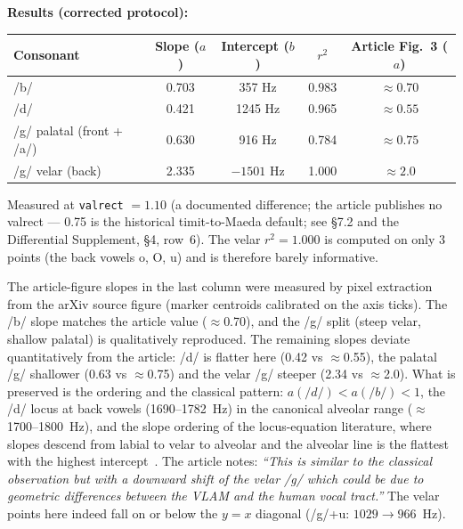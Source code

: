 \documentclass[11pt,a4paper]{article}
\begin{document}
\textbf{Results (corrected protocol):}

\begin{center}
\begin{tabular}{lcccc}
\toprule
Consonant & Slope ($a$) & Intercept ($b$) & $r^2$ & Article Fig.~3 ($a$) \\
\midrule
/b/ & 0.703 & 357 Hz & 0.983 & $\approx 0.70$ \\
/d/ & 0.421 & 1245 Hz & 0.965 & $\approx 0.55$ \\
/g/ palatal (front + /a/) & 0.630 & 916 Hz & 0.784 & $\approx 0.75$ \\
/g/ velar (back) & 2.335 & $-1501$ Hz & 1.000 & $\approx 2.0$ \\
\bottomrule
\end{tabular}

\smallskip
Measured at \texttt{valrect} $= 1.10$ (a documented difference; the
article publishes no valrect --- 0.75 is the historical timit-to-Maeda
default; see \S7.2 and the Differential Supplement, \S4, row~6). The
velar $r^2 = 1.000$ is
computed on only 3 points (the back vowels o, O, u) and is therefore
barely informative.
\end{center}

The article-figure slopes in the last column were measured by pixel
extraction from the arXiv source figure (marker centroids calibrated
on the axis ticks). The /b/ slope matches the article value
($\approx$0.70), and the /g/ split (steep velar, shallow palatal) is
qualitatively reproduced. The remaining slopes deviate quantitatively
from the article: /d/ is flatter here (0.42 vs $\approx$0.55), the
palatal /g/ shallower (0.63 vs $\approx$0.75) and the velar /g/
steeper (2.34 vs $\approx$2.0). What is preserved is the ordering and
the classical pattern: $a(/d/) < a(/b/) < 1$, the /d/ locus at back
vowels (1690--1782~Hz) in the canonical alveolar range
($\approx$1700--1800~Hz), and the slope ordering of the
locus-equation literature, where slopes descend from labial to velar
to alveolar and the alveolar line is the flattest with the highest
intercept~\cite{sussman1991,iskarous2010}. The article notes:
\textit{``This is similar to the classical observation but with a
downward shift of the velar /g/ which could be due to geometric
differences between the VLAM and the human vocal tract.''} The velar
points here indeed fall on or below the $y = x$ diagonal
(/g/+u: $1029 \to 966$~Hz).
\end{document}
